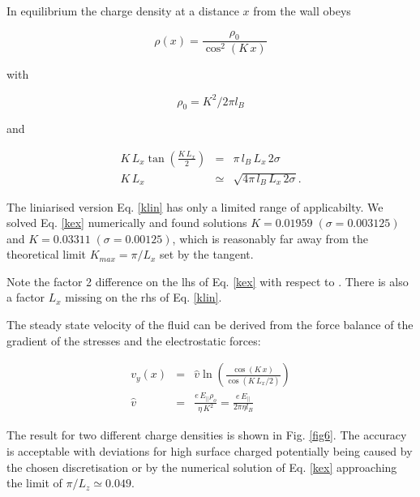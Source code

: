 \documentclass[aps,pre,preprint,groupedaddress]{revtex4-1}
\begin{document}
In equilibrium the charge density at a distance $x$ from the wall obeys

\begin{equation}
\rho(x)=\frac{\rho_0}{\cos^2(K\,x)}
\end{equation}

with 

\begin{equation}
\rho_0=K^2/2\pi l_B
\end{equation}

and 

\begin{eqnarray}
K \,L_x \tan\left(\frac{K\, L_x}{2}\right)&=&\pi\, l_B\, L_x\, 2\sigma\label{kex} \\
K \,L_x&\simeq&\sqrt{4\pi \,l_B\,L_x\,2\sigma}\label{klin}.
\end{eqnarray}

The liniarised version Eq. \ref{klin} has only a limited range of applicabilty.
We solved Eq. \ref{kex} numerically and found solutions 
$K=0.01959\; (\sigma=0.003125)$ and $K=0.03311\; (\sigma=0.00125)$, 
which is reasonably far away from the 
theoretical limit $K_{max}=\pi/L_x$ set by the tangent. 

Note the factor 2 difference on the lhs of Eq. \ref{kex} with respect 
to \cite{Capuani, Rotenberg}. There is also a factor $L_x$ missing on 
the rhs of Eq. \ref{klin}.

The steady state velocity of the fluid can be derived from the 
force balance of the gradient of the stresses and the electrostatic
forces:

\begin{eqnarray}
v_y(x)&=&\hat{v} \ln\left(\frac{\cos(K\,x)}{\cos(K\,L_x/2)}\right)\label{vy}\\
\hat{v}&=&\frac{e \,E_{||}\rho_o}{\eta\, K^2}=\frac{e \,E_{||}}{2\pi\eta l_B}\label{vhat}
\end{eqnarray}

The result for two different charge densities is shown in Fig. \ref{fig6}.
The accuracy is acceptable with deviations for high surface 
charged potentially being caused by the chosen discretisation or 
by the numerical solution of Eq. \ref{kex} approaching the limit 
of $\pi/L_z\simeq0.049$.  
\end{document}
